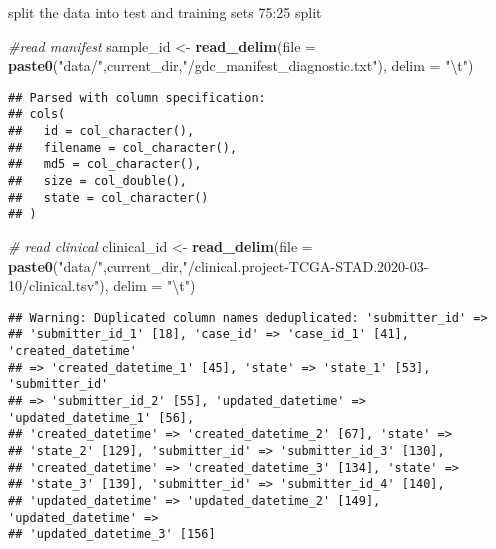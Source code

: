 \documentclass[]{article}
\newenvironment{Shaded}{\begin{snugshade}}{\end{snugshade}}
\newcommand{\KeywordTok}[1]{\textcolor[rgb]{0.13,0.29,0.53}{\textbf{#1}}}
\newcommand{\DataTypeTok}[1]{\textcolor[rgb]{0.13,0.29,0.53}{#1}}
\newcommand{\CharTok}[1]{\textcolor[rgb]{0.31,0.60,0.02}{#1}}
\newcommand{\StringTok}[1]{\textcolor[rgb]{0.31,0.60,0.02}{#1}}
\newcommand{\CommentTok}[1]{\textcolor[rgb]{0.56,0.35,0.01}{\textit{#1}}}
\newcommand{\OperatorTok}[1]{\textcolor[rgb]{0.81,0.36,0.00}{\textbf{#1}}}
\newcommand{\NormalTok}[1]{#1}
\begin{document}
\begin{Shaded}
\end{Shaded}

split the data into test and training sets 75:25 split

\begin{Shaded}
\begin{Highlighting}[]
\CommentTok{#read manifest}
\NormalTok{sample_id <-}\StringTok{ }\KeywordTok{read_delim}\NormalTok{(}\DataTypeTok{file =} \KeywordTok{paste0}\NormalTok{(}\StringTok{"data/"}\NormalTok{,current_dir,}\StringTok{"/gdc_manifest_diagnostic.txt"}\NormalTok{), }\DataTypeTok{delim =} \StringTok{"}\CharTok{\textbackslash{}t}\StringTok{"}\NormalTok{)}
\end{Highlighting}
\end{Shaded}

\begin{verbatim}
## Parsed with column specification:
## cols(
##   id = col_character(),
##   filename = col_character(),
##   md5 = col_character(),
##   size = col_double(),
##   state = col_character()
## )
\end{verbatim}

\begin{Shaded}
\begin{Highlighting}[]
\CommentTok{# read clinical}
\NormalTok{clinical_id <-}\StringTok{ }\KeywordTok{read_delim}\NormalTok{(}\DataTypeTok{file =} \KeywordTok{paste0}\NormalTok{(}\StringTok{"data/"}\NormalTok{,current_dir,}\StringTok{"/clinical.project-TCGA-STAD.2020-03-10/clinical.tsv"}\NormalTok{), }\DataTypeTok{delim =} \StringTok{"}\CharTok{\textbackslash{}t}\StringTok{"}\NormalTok{)}
\end{Highlighting}
\end{Shaded}

\begin{verbatim}
## Warning: Duplicated column names deduplicated: 'submitter_id' =>
## 'submitter_id_1' [18], 'case_id' => 'case_id_1' [41], 'created_datetime'
## => 'created_datetime_1' [45], 'state' => 'state_1' [53], 'submitter_id'
## => 'submitter_id_2' [55], 'updated_datetime' => 'updated_datetime_1' [56],
## 'created_datetime' => 'created_datetime_2' [67], 'state' =>
## 'state_2' [129], 'submitter_id' => 'submitter_id_3' [130],
## 'created_datetime' => 'created_datetime_3' [134], 'state' =>
## 'state_3' [139], 'submitter_id' => 'submitter_id_4' [140],
## 'updated_datetime' => 'updated_datetime_2' [149], 'updated_datetime' =>
## 'updated_datetime_3' [156]
\end{verbatim}
\end{document}
